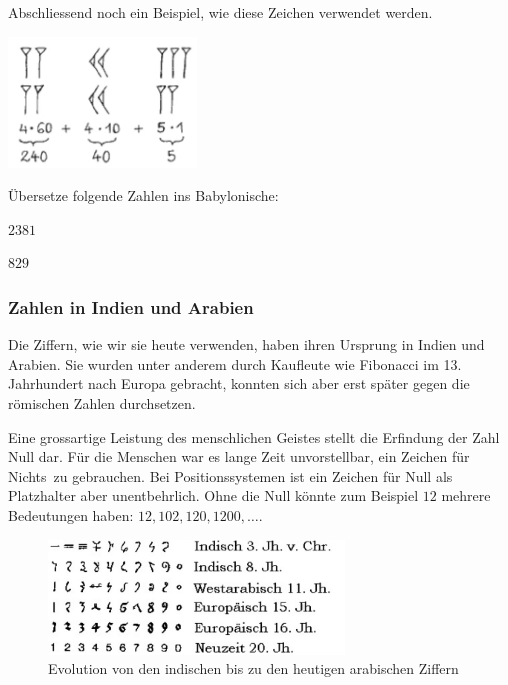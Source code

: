 \documentclass[%
11pt,%
twoside,%
titlepage,%
german,%
]{scrartcl}
\begin{document}
Abschliessend noch ein Beispiel, wie diese Zeichen verwendet werden.
\begin{center}
\includegraphics[width=5cm]{pictures/babylon285}
\end{center}
\begin{ueb}[übersetze]
\"Ubersetze folgende Zahlen ins \glqq Babylonische\grqq:

\begin{minipage}{0.4\textwidth}
\begin{enumeratea}
\item $2381$
\end{enumeratea}
\end{minipage}
\begin{minipage}{0.23\textwidth}
\begin{enumeratea}
\addtocounter{enumi}{1}
\item $829$
\end{enumeratea}
\end{minipage}
\end{ueb}

\subsubsection{Zahlen in Indien und Arabien}
Die Ziffern, wie wir sie heute verwenden, haben ihren Ursprung in Indien und Arabien. Sie wurden unter anderem durch Kaufleute wie Fibonacci im 13. Jahrhundert nach Europa gebracht, konnten sich aber erst sp\"ater gegen die r\"omischen Zahlen durchsetzen.

Eine grossartige Leistung des menschlichen Geistes stellt die Erfindung der Zahl Null dar. F\"ur die Menschen war es lange Zeit unvorstellbar, ein Zeichen f\"ur \glqq Nichts\grqq\  zu gebrauchen. Bei Positionssystemen ist ein Zeichen f\"ur Null als Platzhalter aber unentbehrlich. Ohne die Null k\"onnte zum Beispiel $12$ mehrere Bedeutungen haben: $12, 102, 120, 1200, \dots$.
\begin{figure}[h]
\begin{center}
\includegraphics[width=0.7\textwidth]{pictures/entwzahl}
\end{center}
\caption{Evolution von den indischen bis zu den heutigen arabischen Ziffern}
\end{figure}
\end{document}
